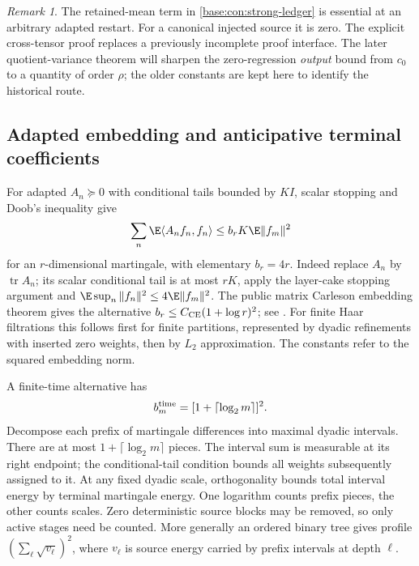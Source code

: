 \documentclass[11pt,oneside,openany,a4paper]{book}
\numberwithin{equation}{chapter}
\theoremstyle{definition}
\theoremstyle{remark}
\newtheorem{remark}[theorem]{Remark}
\DeclareMathOperator{\tr}{tr}\DeclareMathOperator{\rank}{rank}
\begin{document}
\begin{remark}
The retained-mean term in \eqref{base:con:strong-ledger} is essential at an arbitrary adapted restart. For a canonical injected source it is zero. The explicit cross-tensor proof replaces a previously incomplete proof interface. The later quotient-variance theorem will sharpen the zero-regression \emph{output} bound from $c_0$ to a quantity of order $\rho$; the older constants are kept here to identify the historical route.
\end{remark}

\subsection{Adapted embedding and anticipative terminal coefficients}
For adapted $A_n\succeq0$ with conditional tails bounded by $KI$, scalar stopping and Doob's inequality give
\[
 \sum_n\E\langle A_nf_n,f_n\rangle\le b_rK\E\|f_m\|^2
\]
for an $r$-dimensional martingale, with elementary $b_r=4r$. Indeed replace $A_n$ by $\tr A_n$; its scalar conditional tail is at most $rK$, apply the layer-cake stopping argument and $\E\sup_n\|f_n\|^2\le4\E\|f_m\|^2$. The public matrix Carleson embedding theorem gives the alternative $b_r\le C_{\rm CE}(1+\log r)^2$; see \cite{NTV,NPTV}. For finite Haar filtrations this follows first for finite partitions, represented by dyadic refinements with inserted zero weights, then by $L_2$ approximation. The constants refer to the squared embedding norm.

A finite-time alternative has
\begin{equation}\label{base:new:time-embed}
 b_m^{\rm time}=[1+\lceil\log_2m\rceil]^2.
\end{equation}
Decompose each prefix of martingale differences into maximal dyadic intervals. There are at most $1+\lceil\log_2m\rceil$ pieces. The interval sum is measurable at its right endpoint; the conditional-tail condition bounds all weights subsequently assigned to it. At any fixed dyadic scale, orthogonality bounds total interval energy by terminal martingale energy. One logarithm counts prefix pieces, the other counts scales. Zero deterministic source blocks may be removed, so only active stages need be counted. More generally an ordered binary tree gives profile $(\sum_\ell\sqrt{v_\ell})^2$, where $v_\ell$ is source energy carried by prefix intervals at depth $\ell$.
\end{document}
